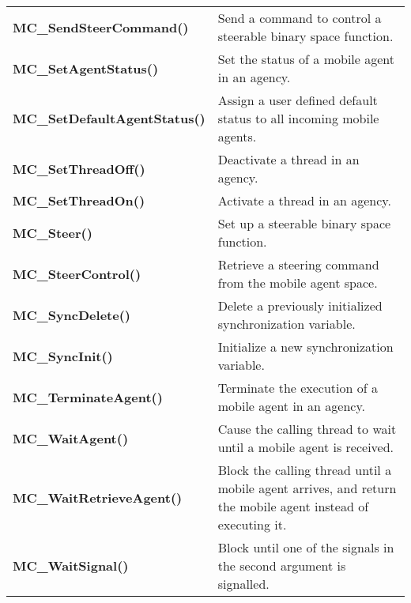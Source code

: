 \begin{table}[!hp]
\begin{center}
\begin{tabular}{p{63 mm}p{97 mm}}
{\bf MC\_SendSteerCommand()} \dotfill & Send a command to control a steerable binary space function. \\
{\bf MC\_SetAgentStatus()} \dotfill & Set the status of a mobile agent in an agency. \\
{\bf MC\_SetDefaultAgentStatus()} \dotfill & Assign a user defined default status to all incoming mobile agents. \\
{\bf MC\_SetThreadOff()} \dotfill & Deactivate a thread in an agency. \\
{\bf MC\_SetThreadOn()} \dotfill & Activate a thread in an agency. \\
{\bf MC\_Steer()} \dotfill & Set up a steerable binary space function. \\
{\bf MC\_SteerControl()} \dotfill & Retrieve a steering command from the mobile agent space. \\
{\bf MC\_SyncDelete()} \dotfill & Delete a previously initialized synchronization variable. \\
{\bf MC\_SyncInit()} \dotfill & Initialize a new synchronization variable. \\
{\bf MC\_TerminateAgent()} \dotfill & Terminate the execution of a mobile agent in an agency. \\
{\bf MC\_WaitAgent()} \dotfill & Cause the calling thread to wait until a mobile agent is received. \\
{\bf MC\_WaitRetrieveAgent()} \dotfill & Block the calling thread until a mobile agent arrives, and return the mobile agent instead of executing it. \\
{\bf MC\_WaitSignal()} \dotfill & Block until one of the signals in the second argument is signalled.\\
\hline
\end{tabular}
\end{center}
\end{table}
\pagebreak

